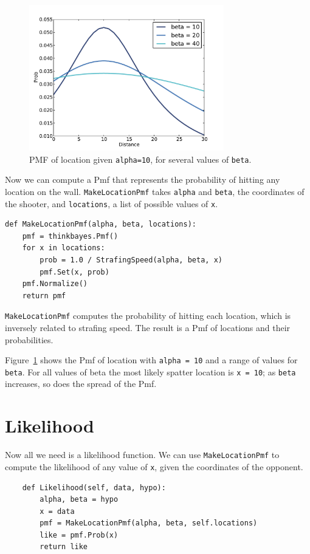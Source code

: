 \documentclass[12pt]{book}
\begin{document}
\begin{figure}
\centerline{\includegraphics[height=2.5in]{figs/paintball1.pdf}}
\caption{PMF of location given {\tt alpha=10}, for several values of
  {\tt beta}.}
\label{fig.paintball1}
\end{figure}

Now we can compute a Pmf that represents the probability of hitting
any location on the wall.  {\tt MakeLocationPmf} takes {\tt alpha} and
{\tt beta}, the coordinates of the shooter, and {\tt locations}, a
list of possible values of {\tt x}.

\begin{verbatim}
def MakeLocationPmf(alpha, beta, locations):
    pmf = thinkbayes.Pmf()
    for x in locations:
        prob = 1.0 / StrafingSpeed(alpha, beta, x)
        pmf.Set(x, prob)
    pmf.Normalize()
    return pmf
\end{verbatim}

{\tt MakeLocationPmf} computes the probability of hitting
each location, which is inversely related to
strafing speed.  The result is a Pmf of locations and their
probabilities.

Figure~\ref{fig.paintball1} shows the Pmf of location with {\tt alpha
  = 10} and a range of values for {\tt beta}.  For all values of beta
the most likely spatter location is {\tt x = 10}; as {\tt beta}
increases, so does the spread of the Pmf.



\section{Likelihood}

Now all we need is a likelihood function.
We can use {\tt MakeLocationPmf} to compute the likelihood
of any value of {\tt x}, given the coordinates of the opponent.

\begin{verbatim}
    def Likelihood(self, data, hypo):
        alpha, beta = hypo
        x = data
        pmf = MakeLocationPmf(alpha, beta, self.locations)
        like = pmf.Prob(x)
        return like
\end{verbatim}
\end{document}
